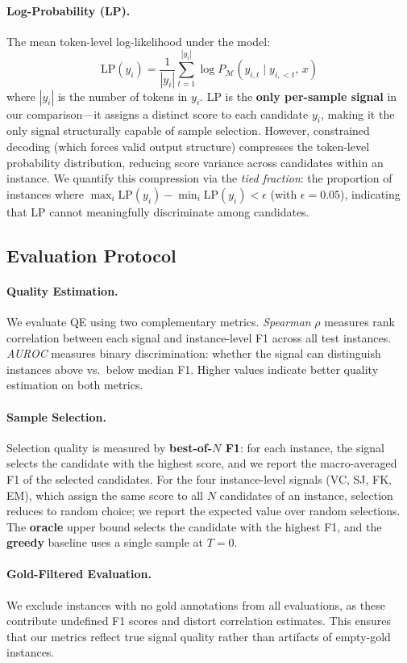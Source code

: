 \paragraph{Log-Probability (LP).}
The mean token-level log-likelihood under the model:
\begin{equation}
    \mathrm{LP}(y_i) = \frac{1}{|y_i|} \sum_{t=1}^{|y_i|} \log P_{\mathcal{M}}(y_{i,t} \mid y_{i,<t},\, x)
    \label{eq:lp}
\end{equation}
where $|y_i|$ is the number of tokens in $y_i$.
LP is the \textbf{only per-sample signal} in our comparison---it assigns a distinct score to each candidate $y_i$, making it the only signal structurally capable of sample selection.
However, constrained decoding (which forces valid output structure) compresses the token-level probability distribution, reducing score variance across candidates within an instance.
We quantify this compression via the \textit{tied fraction}: the proportion of instances where $\max_i \mathrm{LP}(y_i) - \min_i \mathrm{LP}(y_i) < \epsilon$ (with $\epsilon = 0.05$), indicating that LP cannot meaningfully discriminate among candidates.

\subsection{Evaluation Protocol}

\paragraph{Quality Estimation.}
We evaluate QE using two complementary metrics.
\textit{Spearman} $\rho$ measures rank correlation between each signal and instance-level F1 across all test instances.
\textit{AUROC} measures binary discrimination: whether the signal can distinguish instances above vs.\ below median F1.
Higher values indicate better quality estimation on both metrics.

\paragraph{Sample Selection.}
Selection quality is measured by \textbf{best-of-$N$ F1}: for each instance, the signal selects the candidate with the highest score, and we report the macro-averaged F1 of the selected candidates.
For the four instance-level signals (VC, SJ, FK, EM), which assign the same score to all $N$ candidates of an instance, selection reduces to random choice; we report the expected value over random selections.
The \textbf{oracle} upper bound selects the candidate with the highest F1, and the \textbf{greedy} baseline uses a single sample at $T{=}0$.

\paragraph{Gold-Filtered Evaluation.}
We exclude instances with no gold annotations from all evaluations, as these contribute undefined F1 scores and distort correlation estimates.
This ensures that our metrics reflect true signal quality rather than artifacts of empty-gold instances.
